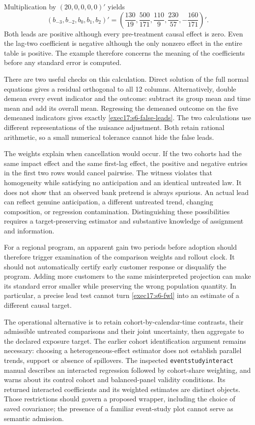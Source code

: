 Multiplication by $(20,0,0,0,0)'$ yields
\begin{equation}
 (b_{-3},b_{-2},b_0,b_1,b_2)'
 =\left(\frac{130}{19},\frac{500}{171},
          \frac{110}{9},\frac{230}{57},-\frac{160}{171}\right)'.
 \label{exec17:s6-false-leads}
\end{equation}
Both leads are positive although every pre-treatment causal effect is zero.
Even the lag-two coefficient is negative although the only nonzero effect
in the entire table is positive. The example therefore concerns the meaning
of the coefficients before any standard error is computed.

There are two useful checks on this calculation. Direct solution of the full
normal equations gives a residual orthogonal to all 12 columns. Alternatively,
double demean every event indicator and the outcome: subtract its group
mean and time mean and add its overall mean. Regressing the demeaned outcome
on the five demeaned indicators gives exactly
\eqref{exec17:s6-false-leads}. The two calculations use different
representations of the nuisance adjustment. Both retain rational arithmetic,
so a small numerical tolerance cannot hide the false leads.\citep{exec17_s6_math}

The weights explain when cancellation would occur. If the two cohorts had
the same impact effect and the same first-lag effect, the positive and negative
entries in the first two rows would cancel pairwise. The witness violates
that homogeneity while satisfying no anticipation and an identical untreated
law. It does not show that an observed bank pretrend is always spurious.
An actual lead can reflect genuine anticipation, a different untreated trend,
changing composition, or regression contamination. Distinguishing these
possibilities requires a target-preserving estimator and substantive knowledge
of assignment and information.

For a regional program, an apparent gain two periods before adoption should
therefore trigger examination of the comparison weights and rollout clock.
It should not automatically certify early customer response or disqualify the
program. Adding more customers to the same misinterpreted projection can
make its standard error smaller while preserving the wrong population
quantity. In particular, a precise lead test cannot turn
\eqref{exec17:s6-fwl} into an estimate of a different causal target.

The operational alternative is to retain cohort-by-calendar-time contrasts,
their admissible untreated comparisons and their joint uncertainty, then
aggregate to the declared exposure target. The earlier cohort identification
argument remains necessary: choosing a heterogeneous-effect estimator does
not establish parallel trends, support or absence of spillovers.
The inspected \texttt{eventstudyinteract} manual describes an interacted
regression followed by cohort-share weighting, and warns about its control
cohort and balanced-panel validity conditions. Its returned interacted
coefficients and its weighted estimates are distinct objects.
Those restrictions should govern a proposed wrapper, including the choice
of saved covariance; the presence of a familiar event-study plot cannot
serve as semantic admission.\citep{v12_sw_eventstudyinteract}

